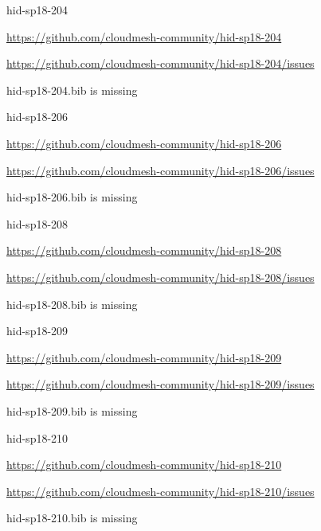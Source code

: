 \begin{IU}

hid-sp18-204

\url{https://github.com/cloudmesh-community/hid-sp18-204}

\url{https://github.com/cloudmesh-community/hid-sp18-204/issues}

hid-sp18-204.bib is missing

\end{IU}


\begin{IU}

hid-sp18-206

\url{https://github.com/cloudmesh-community/hid-sp18-206}

\url{https://github.com/cloudmesh-community/hid-sp18-206/issues}

hid-sp18-206.bib is missing

\end{IU}


\begin{IU}

hid-sp18-208

\url{https://github.com/cloudmesh-community/hid-sp18-208}

\url{https://github.com/cloudmesh-community/hid-sp18-208/issues}

hid-sp18-208.bib is missing

\end{IU}


\begin{IU}

hid-sp18-209

\url{https://github.com/cloudmesh-community/hid-sp18-209}

\url{https://github.com/cloudmesh-community/hid-sp18-209/issues}

hid-sp18-209.bib is missing

\end{IU}


\begin{IU}

hid-sp18-210

\url{https://github.com/cloudmesh-community/hid-sp18-210}

\url{https://github.com/cloudmesh-community/hid-sp18-210/issues}

hid-sp18-210.bib is missing

\end{IU}


